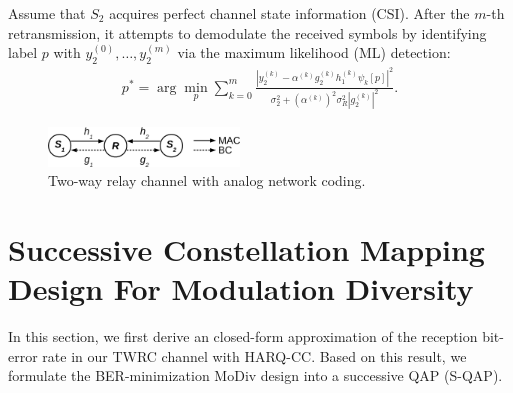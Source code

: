 \documentclass[journal]{IEEEtran}
\begin{document}
Assume that $S_2$ acquires perfect channel state information
(CSI). After the $m$-th retransmission, it attempts to demodulate the received symbols by
identifying label $p$ with $y_2^{(0)},\ldots,y_2^{(m)}$ via the maximum
likelihood (ML) detection:
\begin{align}
  p^* = \arg\min_p\sum_{k=0}^{m} \frac{|y_2^{(k)} -
  \alpha^{(k)} g_2^{(k)} h_1^{(k)}\psi_k[p]|^2}
  {\sigma_2^2+(\alpha^{(k)})^2\sigma_R^2|g_2^{(k)}|^2}.
  \label{eq:ml}
\end{align}

\begin{figure}[!t]
  \centering
  \includegraphics[width=2.0in]{./figs/model.eps}
  \caption{Two-way relay channel with analog network coding.}
  \label{fig:model}
\end{figure}

\section{Successive Constellation Mapping Design For Modulation Diversity}
\label{sec:modiv}
In this section, we first derive an closed-form approximation of
the reception bit-error rate in our TWRC channel with HARQ-CC. Based on this
result, we formulate the BER-minimization MoDiv design into a successive
QAP (S-QAP).
\end{document}
